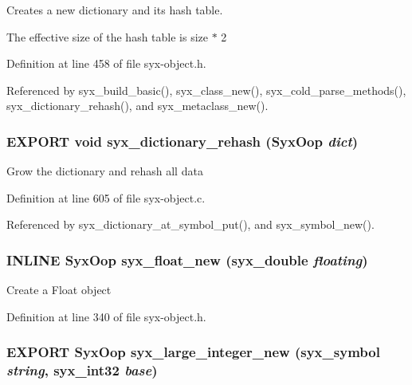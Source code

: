 Creates a new dictionary and its hash table.

The effective size of the hash table is size $\ast$ 2 

Definition at line 458 of file syx-object.h.

Referenced by syx\_\-build\_\-basic(), syx\_\-class\_\-new(), syx\_\-cold\_\-parse\_\-methods(), syx\_\-dictionary\_\-rehash(), and syx\_\-metaclass\_\-new().\hypertarget{syx-object_8h_29f9745780d60c8acb1ad0dc4364fe57}{
\subsubsection{\setlength{\rightskip}{0pt plus 5cm}EXPORT void syx\_\-dictionary\_\-rehash ({\bf SyxOop} {\em dict})}}
\label{syx-object_8h_29f9745780d60c8acb1ad0dc4364fe57}


Grow the dictionary and rehash all data 

Definition at line 605 of file syx-object.c.

Referenced by syx\_\-dictionary\_\-at\_\-symbol\_\-put(), and syx\_\-symbol\_\-new().\hypertarget{syx-object_8h_3685f2e5efa8127ecee98dd3f37f320c}{
\subsubsection{\setlength{\rightskip}{0pt plus 5cm}INLINE {\bf SyxOop} syx\_\-float\_\-new ({\bf syx\_\-double} {\em floating})}}
\label{syx-object_8h_3685f2e5efa8127ecee98dd3f37f320c}


Create a Float object 

Definition at line 340 of file syx-object.h.\hypertarget{syx-object_8h_6e4566798088986aa8af7c776a00b90b}{
\subsubsection{\setlength{\rightskip}{0pt plus 5cm}EXPORT {\bf SyxOop} syx\_\-large\_\-integer\_\-new ({\bf syx\_\-symbol} {\em string}, \/  {\bf syx\_\-int32} {\em base})}}
\label{syx-object_8h_6e4566798088986aa8af7c776a00b90b}


